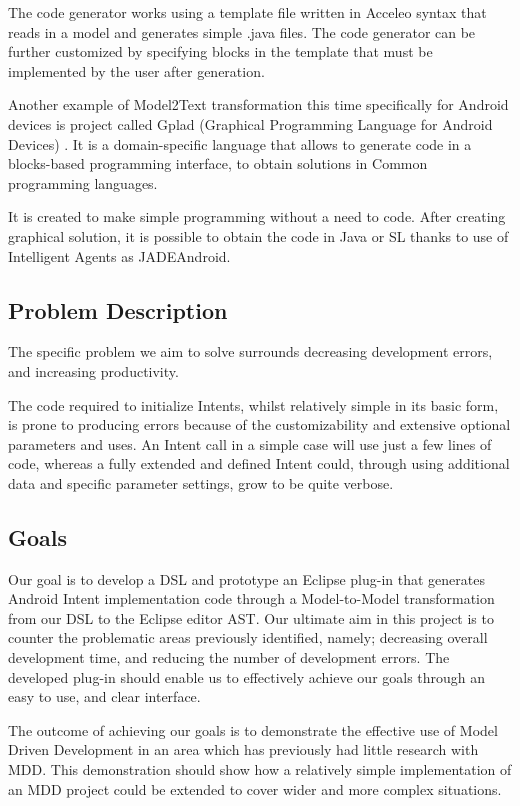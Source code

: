 The code generator works using a template file written in Acceleo syntax that reads in a model and generates simple .java files. The code generator can be further customized by specifying blocks in the template that must be implemented by the user after generation.

Another example of Model2Text transformation this time specifically for Android devices is project called Gplad (Graphical Programming Language for Android Devices) \cite{gplad}. It is a domain-specific language that allows to generate code in a blocks-based programming interface, to obtain solutions in Common programming languages.

It is created to make simple programming without a need to code. After creating graphical solution, it is possible to obtain the code in Java or SL thanks to use of Intelligent Agents as JADEAndroid.

\subsection{Problem Description} 
The specific problem we aim to solve surrounds decreasing development errors, and increasing productivity.

The code required to initialize Intents, whilst relatively simple in its basic form, is prone to producing errors because of the customizability and extensive optional parameters and uses. An Intent call in a simple case will use just a few lines of code, whereas a fully extended and defined Intent could, through using additional data and specific parameter settings, grow to be quite verbose.

\subsection{Goals}
Our goal is to develop a DSL and prototype an Eclipse plug-in that generates Android Intent implementation code through a Model-to-Model transformation from our DSL to the Eclipse editor AST. Our ultimate aim in this project is to counter the problematic areas previously identified, namely; decreasing overall development time, and reducing the number of development errors. The developed plug-in should enable us to effectively achieve our goals through an easy to use, and clear interface.

The outcome of achieving our goals is to demonstrate the effective use of Model Driven Development in an area which has previously had little research with MDD. This demonstration should show how a relatively simple implementation of an MDD project could be extended to cover wider and more complex situations.

